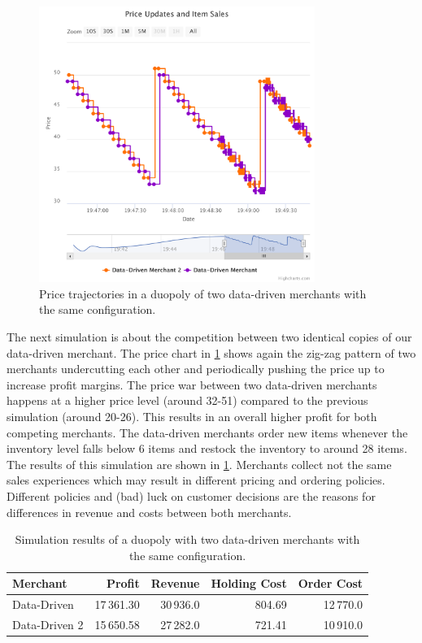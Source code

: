 \begin{figure}[t]
	\centering
	\includegraphics[width=0.8\textwidth]{figures/duopoly_data_prices}
	\caption{Price trajectories in a duopoly of two data-driven merchants with the same configuration.}
	\label{fig:duopoly_data_prices}
\end{figure}

The next simulation is about the competition between two identical copies of our data-driven merchant.
The price chart in \cref{fig:duopoly_data_prices} shows again the zig-zag pattern of two merchants undercutting each other and periodically pushing the price up to increase profit margins.
The price war between two data-driven merchants happens at a higher price level (around 32-51) compared to the previous simulation (around 20-26).
This results in an overall higher profit for both competing merchants.
The data-driven merchants order new items whenever the inventory level falls below 6 items and restock the inventory to around 28 items.
The results of this simulation are shown in \cref{tab:duopoly_data}.
Merchants collect not the same sales experiences which may result in different pricing and ordering policies.
Different policies and (bad) luck on customer decisions are the reasons for differences in revenue and costs between both merchants.

\begin{table}[t]
	\centering
	\begin{tabular}{lrrrr}
		\toprule
		Merchant & Profit & Revenue & Holding Cost & Order Cost \\
		\midrule
		Data-Driven   & 17\,361.30 & 30\,936.0 & 804.69 & 12\,770.0 \\
		Data-Driven 2 & 15\,650.58 & 27\,282.0 & 721.41 & 10\,910.0 \\
		\bottomrule
	\end{tabular}
	\caption{Simulation results of a duopoly with two data-driven merchants with the same configuration.}
	\label{tab:duopoly_data}
\end{table}

